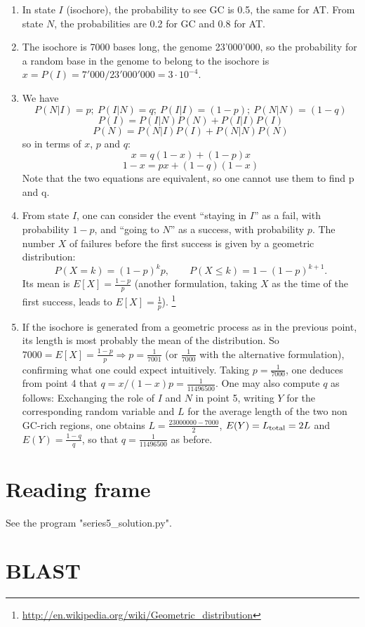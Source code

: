 \documentclass[a4paper,11pt]{article}
\begin{document}
\begin{enumerate}
\item In state $I$ (isochore), the probability to see GC is 0.5, the same for AT. From state $N$, the probabilities are 0.2 for GC and 0.8 for AT.
\item The isochore is 7000 bases long, the genome 23'000'000, so the probability for a random base in the genome to belong to the isochore is $x = P(I) = 7'000/23'000'000 = 3\cdot 10^{-4}$.
\item We have
$$ P(N|I)=p; \ P(I|N)=q; \ P(I|I)=(1-p); \ P(N|N)=(1-q)$$
$$ P(I) = P(I|N)P(N) + P(I|I)P(I) $$
$$ P(N) = P(N|I)P(I) + P(N|N)P(N) $$
so in terms of $x$, $p$ and $q$:
$$ x = q(1-x) + (1-p)x $$
$$ 1-x = px + (1-q)(1-x) $$
Note that the two equations are equivalent, so one cannot use them to find p and q.
\item From state $I$, one can consider the event ``staying in $I$'' as a fail, with probability $1-p$, and ``going to $N$'' as a success, with probability $p$. The number $X$ of failures before the first success is given by a geometric distribution:
$$ P(X=k) = (1-p)^k p, \qquad P(X\leq k) = 1-(1-p)^{k+1}. $$
Its mean is $E[X] = \frac{1-p}{p}$ (another formulation, taking $X$ as the time of the first success, leads to $E[X] = \frac{1}{p}$).
\footnote{\url{http://en.wikipedia.org/wiki/Geometric_distribution}}
\item If the isochore is generated from a geometric process as in the previous point, its length is most probably the mean of the distribution. So $7000 = E[X] = \frac{1-p}{p} \Rightarrow p = \frac{1}{7001}$ (or $\frac{1}{7000}$ with the alternative formulation), confirming what one could expect intuitively. Taking $p=\frac{1}{7000}$, one deduces from point 4 that $q = x/(1-x) p = \frac{1}{11496500}$. One may also compute $q$ as follows: Exchanging the role of $I$ and $N$ in point 5, writing $Y$ for the corresponding random variable and $L$ for the average length of the two non GC-rich regions, one obtains $L= \frac{23000000-7000}{2}$, $E(Y)=L_{\rm total}=2L$ and $E(Y) =  \frac{1-q}{q}$, so that $q = \frac{1}{11496500}$ as before.
\end{enumerate}

\section{Reading frame}

See the program "series5\_solution.py".

\section{BLAST}
\end{document}

